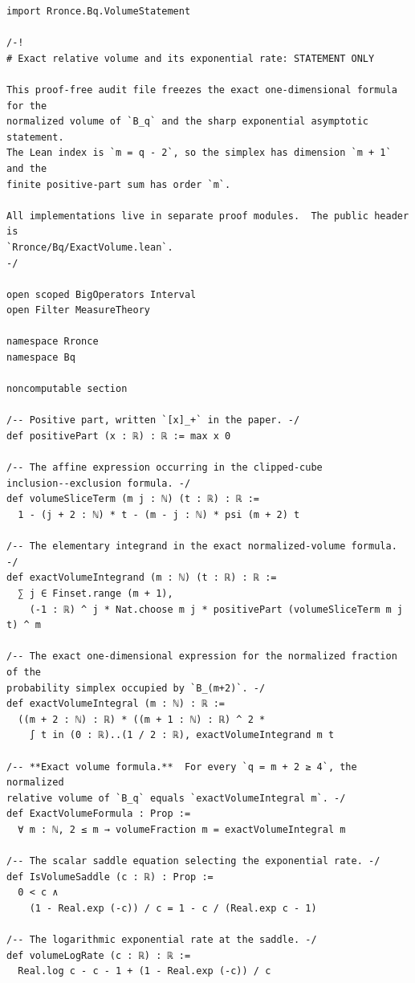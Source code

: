 \documentclass[11pt]{article}
\theoremstyle{definition}
\theoremstyle{remark}
\begin{document}
\begin{lstlisting}
import Rronce.Bq.VolumeStatement

/-!
# Exact relative volume and its exponential rate: STATEMENT ONLY

This proof-free audit file freezes the exact one-dimensional formula for the
normalized volume of `B_q` and the sharp exponential asymptotic statement.
The Lean index is `m = q - 2`, so the simplex has dimension `m + 1` and the
finite positive-part sum has order `m`.

All implementations live in separate proof modules.  The public header is
`Rronce/Bq/ExactVolume.lean`.
-/

open scoped BigOperators Interval
open Filter MeasureTheory

namespace Rronce
namespace Bq

noncomputable section

/-- Positive part, written `[x]_+` in the paper. -/
def positivePart (x : ℝ) : ℝ := max x 0

/-- The affine expression occurring in the clipped-cube
inclusion--exclusion formula. -/
def volumeSliceTerm (m j : ℕ) (t : ℝ) : ℝ :=
  1 - (j + 2 : ℕ) * t - (m - j : ℕ) * psi (m + 2) t

/-- The elementary integrand in the exact normalized-volume formula. -/
def exactVolumeIntegrand (m : ℕ) (t : ℝ) : ℝ :=
  ∑ j ∈ Finset.range (m + 1),
    (-1 : ℝ) ^ j * Nat.choose m j * positivePart (volumeSliceTerm m j t) ^ m

/-- The exact one-dimensional expression for the normalized fraction of the
probability simplex occupied by `B_(m+2)`. -/
def exactVolumeIntegral (m : ℕ) : ℝ :=
  ((m + 2 : ℕ) : ℝ) * ((m + 1 : ℕ) : ℝ) ^ 2 *
    ∫ t in (0 : ℝ)..(1 / 2 : ℝ), exactVolumeIntegrand m t

/-- **Exact volume formula.**  For every `q = m + 2 ≥ 4`, the normalized
relative volume of `B_q` equals `exactVolumeIntegral m`. -/
def ExactVolumeFormula : Prop :=
  ∀ m : ℕ, 2 ≤ m → volumeFraction m = exactVolumeIntegral m

/-- The scalar saddle equation selecting the exponential rate. -/
def IsVolumeSaddle (c : ℝ) : Prop :=
  0 < c ∧
    (1 - Real.exp (-c)) / c = 1 - c / (Real.exp c - 1)

/-- The logarithmic exponential rate at the saddle. -/
def volumeLogRate (c : ℝ) : ℝ :=
  Real.log c - c - 1 + (1 - Real.exp (-c)) / c


\end{lstlisting}
\end{document}
